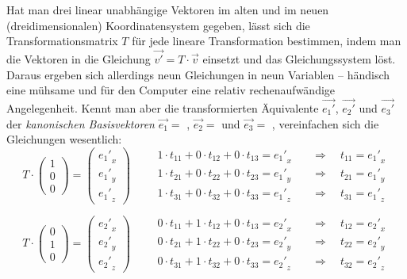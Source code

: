 Hat man drei linear unabhängige Vektoren im alten und im neuen (dreidimensionalen) Koordinatensystem gegeben, lässt sich die Transformationsmatrix $T$ für jede lineare Transformation bestimmen, indem man die Vektoren in die Gleichung $\vec{v'} = T \cdot \vec v$ einsetzt und das Gleichungssystem löst. Daraus ergeben sich allerdings neun Gleichungen in neun Variablen -- händisch eine mühsame und für den Computer eine relativ rechenaufwändige Angelegenheit. Kennt man aber die transformierten Äquivalente $\vec{e_1'}$, $\vec{e_2'}$ und $\vec{e_3'}$ der \emph{kanonischen Basisvektoren} $\vec{e_1} =$ , $\vec{e_2} =$  und $\vec{e_3} =$ , vereinfachen sich die Gleichungen wesentlich:
\begin{equation}
 T \cdot \begin{pmatrix} 1 \\ 0 \\ 0 \end{pmatrix} = \begin{pmatrix} {e_1'}_x \\ {e_1'}_y \\ {e_1'}_z \end{pmatrix} \qquad 
\begin{aligned}
 1 \cdot t_{11} + 0 \cdot t_{12} + 0 \cdot t_{13} = {e_1'}_x \quad &\Rightarrow \quad t_{11} = {e_1'}_x \\
 1 \cdot t_{21} + 0 \cdot t_{22} + 0 \cdot t_{23} = {e_1'}_y \quad &\Rightarrow \quad t_{21} = {e_1'}_y \\
 1 \cdot t_{31} + 0 \cdot t_{32} + 0 \cdot t_{33} = {e_1'}_z \quad &\Rightarrow \quad t_{31} = {e_1'}_z
\end{aligned}
\end{equation}

\begin{equation}
 T \cdot \begin{pmatrix} 0 \\ 1 \\ 0 \end{pmatrix} = \begin{pmatrix} {e_2'}_x \\ {e_2'}_y \\ {e_2'}_z \end{pmatrix} \qquad
\begin{aligned}
 0 \cdot t_{11} + 1 \cdot t_{12} + 0 \cdot t_{13} = {e_2'}_x \quad &\Rightarrow \quad t_{12} = {e_2'}_x \\
 0 \cdot t_{21} + 1 \cdot t_{22} + 0 \cdot t_{23} = {e_2'}_y \quad &\Rightarrow \quad t_{22} = {e_2'}_y \\
 0 \cdot t_{31} + 1 \cdot t_{32} + 0 \cdot t_{33} = {e_2'}_z \quad &\Rightarrow \quad t_{32} = {e_2'}_z
\end{aligned}
\end{equation}

